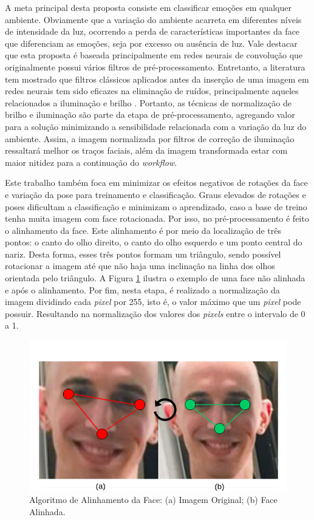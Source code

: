 A meta principal desta proposta consiste em classificar emoções em qualquer ambiente. Obviamente que a variação do ambiente acarreta em diferentes níveis de intensidade da luz, ocorrendo a perda de características importantes da face que diferenciam as emoções, seja por excesso ou ausência de luz. Vale destacar que esta proposta é baseada principalmente em redes neurais de convolução que originalmente possui vários filtros de pré-processamento. Entretanto, a literatura tem mostrado que filtros clássicos aplicados antes da inserção de uma imagem em redes neurais tem sido eficazes na eliminação de ruídos, principalmente aqueles relacionados a iluminação e brilho \citep{art2,art4,art6}. Portanto, as técnicas de normalização de brilho e iluminação são parte da etapa de pré-processamento, agregando valor para a solução minimizando a sensibilidade relacionada com a variação da luz do ambiente. Assim, a imagem normalizada por filtros de correção de iluminação ressaltará melhor os traços faciais, além da imagem transformada estar com maior nitidez para a continuação do \textit{workflow}.

Este trabalho também foca em minimizar os efeitos negativos de rotações da face e variação da pose para treinamento e classificação. Graus elevados de rotações e poses dificultam a classificação e minimizam o aprendizado, caso a base de treino tenha muita imagem com face rotacionada. Por isso, no pré-processamento é feito o alinhamento da face. Este alinhamento é por meio da localização de três pontos: o canto do olho direito, o canto do olho esquerdo e um ponto central do nariz. Desta forma, esses três pontos formam um triângulo, sendo possível rotacionar a imagem até que não haja uma inclinação na linha dos olhos orientada pelo triângulo. A Figura \ref{fig:face_alinhada} ilustra o exemplo de uma face não alinhada e após o alinhamento. Por fim, nesta etapa, é realizado a normalização da imagem dividindo cada \textit{pixel} por 255, isto é, o valor máximo que um \textit{pixel} pode possuir. Resultando na normalização dos valores dos \textit{pixels} entre o intervalo de 0 a 1. 

\begin{figure}
\centering
\includegraphics[scale=0.46]{figuras/face_alinhada.png}
\caption{Algoritmo de Alinhamento da Face: (a) Imagem Original; (b) Face Alinhada. }
\label{fig:face_alinhada}
\end{figure}

